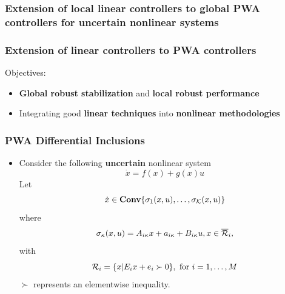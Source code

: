 \documentclass{beamer}
\newcommand{\RR}{{\cal R}}
\newcommand{\KA}{{\cal K}}
\newcommand{\beq}{\begin{equation*}}
\newcommand{\eeq}{\end{equation*}}
\newcommand{\CO}{\textbf{Conv}}
\begin{document}
  \frame
  {
    \frametitle{Extension of local linear controllers to global PWA controllers for uncertain nonlinear systems}

    \centerline{}
  }

  \frame
  {
    \frametitle{Extension of linear controllers to PWA controllers}
    Objectives:
    \begin{itemize}
\item \textbf{Global robust stabilization} and \textbf{local robust performance}
\item Integrating good \textbf{linear techniques} into \textbf{nonlinear methodologies}
\end{itemize}
  }

  \frame
  {
    \frametitle{PWA Differential Inclusions}
    \begin{itemize}
    \item Consider the following \textbf{uncertain} nonlinear system
\beq
\dot x=f(x)+g(x)u
\eeq
Let 
\beq
\dot x\in\CO\{\sigma_{1}(x,u),\ldots,\sigma_\KA(x,u)\}
\eeq
where
\beq
\sigma_\kappa(x,u)=A_{i\kappa}x+a_{i\kappa}+B_{i\kappa} u, x\in\overline\RR_i,
\eeq
with  
\beq
\RR_i = \{ x| E_ix+e_i \succ 0\}, \text{ for } i=1,\ldots,M
\eeq
$\succ$ represents an elementwise inequality.
\end{itemize}
  }
\end{document}

